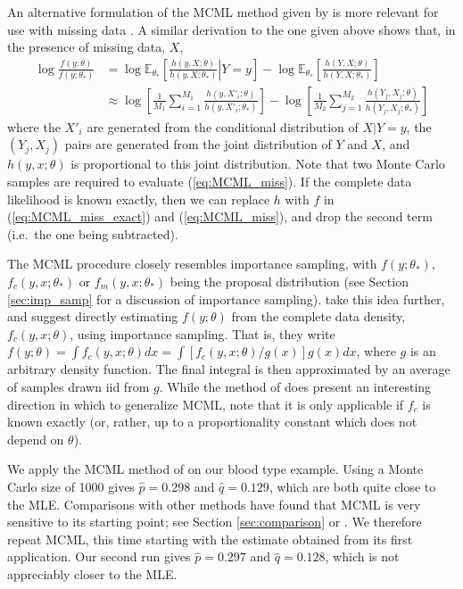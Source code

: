 \documentclass[11pt, oneside]{article}   	%
\newcommand{\bE}{\mathbb{E}}
\begin{document}
An alternative formulation of the MCML method given by \citet{Gel93} is more relevant for use with missing data \citep[see also][]{Gey94}. A similar derivation to the one given above shows that, in the presence of missing data, $X$,
%
\begin{align}
    \log \frac{f(y; \theta)}{f(y; \theta_*)} &= \log \bE_{\theta_*} \left[ \left. \frac{h(y, X; \theta)}{h(y, X; \theta_*)} \right| Y=y \right] - \log \bE_{\theta_*} \left[\frac{h(Y, X; \theta)}{h(Y, X; \theta_*)}\right] \label{eq:MCML_miss_exact}\\
    & \approx \log \left[\frac{1}{M_1} \sum_{i=1}^{M_1} \frac{h(y, X'_i; \theta)}{h(y, X'_i; \theta_*)}\right] - \log \left[\frac{1}{M_2} \sum_{j = 1}^{M_2} \frac{h(Y_j, X_j; \theta)}{h(Y_j, X_j; \theta_*)}\right] \label{eq:MCML_miss}
\end{align}
%
where the $X'_i$ are generated from the conditional distribution of $X|Y=y$, the $(Y_j, X_j)$ pairs are generated from the joint distribution of $Y$ and $X$, and $h(y, x; \theta)$ is proportional to this joint distribution. Note that two Monte Carlo samples are required to evaluate (\ref{eq:MCML_miss}). If the complete data likelihood is known exactly, then we can replace $h$ with $f$ in (\ref{eq:MCML_miss_exact}) and (\ref{eq:MCML_miss}), and drop the second term (i.e.\ the one being subtracted).

The MCML procedure closely resembles importance sampling, with $f(y; \theta_*)$, $f_c(y, x; \theta_*)$ or $f_m(y, x; \theta_*)$ being the proposal distribution (see Section \ref{sec:imp_samp} for a discussion of importance sampling). \citet{Jan03} take this idea further, and suggest directly estimating $f(y; \theta)$ from the complete data density, $f_c(y, x; \theta)$, using importance sampling. That is, they write $f(y; \theta) = \int f_c(y, x; \theta) dx = \int [ f_c(y, x; \theta) / g(x)] g(x) dx$, where $g$ is an arbitrary density function. The final integral is then approximated by an average of samples drawn iid from $g$. While the method of \citeauthor{Jan03} does present an interesting direction in which to generalize MCML, note that it is only applicable if $f_c$ is known exactly (or, rather, up to a proportionality constant which does not depend on $\theta$).

We apply the MCML method of \citet{Gey94} on our blood type example. Using a Monte Carlo size of 1000 gives $\hat{p} = 0.298$ and $\hat{q} = 0.129$, which are both quite close to the MLE. Comparisons with other methods have found that MCML is very sensitive to its starting point; see Section \ref{sec:comparison} or \citet{McC97}. We therefore repeat MCML, this time starting with the estimate obtained from its first application. Our second run gives $\hat{p} = 0.297$ and $\hat{q} = 0.128$, which is not appreciably closer to the MLE.
\end{document}
